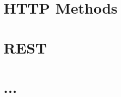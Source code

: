 \documentclass [8pt] {extarticle}
\begin{document}
    \section {HTTP Methods}
    \section {REST}
    \section {...}
\end{document}
